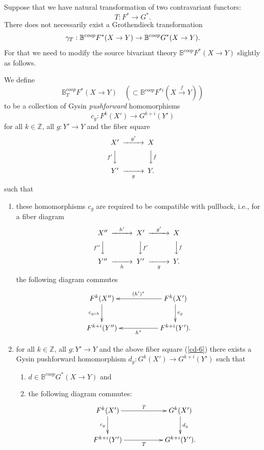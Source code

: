 \documentclass[a4paper]{amsart}
\begin{document}
Suppose that we have natural transformation of two contravariant functors:
$$T:F^* \to G^*.$$
There does not necessarily exist a Grothendieck transformation
$$\gamma_T: \mathbb B^{coop} F^*(X \to Y)  \to  \mathbb B^{coop} G^*(X \to Y)  .$$
For that we need to modify the source bivariant theory $\mathbb B^{coop} F^*(X \to Y)$ slightly as follows.
\begin{defn} We define 
$$\mathbb B^{coop}_T F^*(X \to Y) \quad (\subset \mathbb B^{coop}F^{* i}(X \xrightarrow f Y) )$$
to be a collection of Gysin \emph{pushforward} homomorphisms
$$c_g: F^k(X') \to G^{k+i}(Y')$$
for all $k \in \mathbb Z$, all $g:Y' \to Y$  and the fiber square \, \, \, 
\begin{equation}\label{cd-6}
\CD
X' @> {g'}  >> X\\
@V {f'} VV @VV fV\\
Y' @>> {g} > Y.\\
\endCD
\end{equation}
such that
\begin{enumerate}
\item these homomorphisms $c_g$ are
required to be compatible with pullback, i.e., for a fiber diagram
\begin{equation*}
\CD
X'' @> {h'}  >> X' @> {g'}  >> X\\
@V {f''} VV @VV f'V @VV fV\\
Y'' @>> {h} > Y' @>> {g} > Y.\\
\endCD
\end{equation*}
the following diagram commutes
\begin{equation*}
\xymatrix
{F^k(X'') \ar[d]_{c_{g \circ h}} && F^k(X')\ar[ll]_{(h')^*} \ar[d]^{c_g}\\
F^{k+i}(Y'') && F^{k+i}(Y') \ar[ll]^{h^*}.
}
\end{equation*}

\item for all $k \in \mathbb Z$, all $g:Y' \to Y$  and the above fiber square (\ref{cd-6}) there exists a Gysin pushforward homomorphism $d_g:  G^k(X') \to G^{k+i}(Y')$ such that 
\begin{enumerate}
\item $d \in  \mathbb B^{coop} G^*(X \to Y)$ and 
\item the following diagram commutes:
\begin{equation}\label{cd-7}
\xymatrix
{F^k(X') \ar[d]_{c_g} \ar[rr]^T && G^k(X') \ar[d]^{d_g}\\
F^{k+i}(Y') \ar[rr]_T && G^{k+i}(Y'). 
}
\end{equation}
\end{enumerate}
\end{enumerate}
\end{defn}
\end{document}
